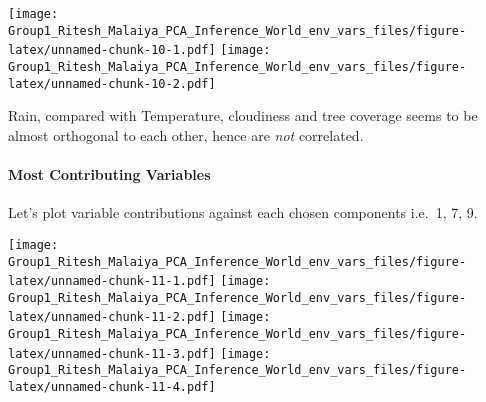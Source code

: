 \documentclass[]{article}
\newenvironment{Shaded}{\begin{snugshade}}{\end{snugshade}}
\newcommand{\DataTypeTok}[1]{\textcolor[rgb]{0.13,0.29,0.53}{#1}}
\newcommand{\DecValTok}[1]{\textcolor[rgb]{0.00,0.00,0.81}{#1}}
\newcommand{\KeywordTok}[1]{\textcolor[rgb]{0.13,0.29,0.53}{\textbf{#1}}}
\newcommand{\NormalTok}[1]{#1}
\newcommand{\OperatorTok}[1]{\textcolor[rgb]{0.81,0.36,0.00}{\textbf{#1}}}
\newcommand{\StringTok}[1]{\textcolor[rgb]{0.31,0.60,0.02}{#1}}
\let\oldparagraph\paragraph
\renewcommand{\paragraph}[1]{\oldparagraph{#1}\mbox{}}
\begin{document}
\begin{Shaded}
\end{Shaded}

\texttt{[image: Group1\_Ritesh\_Malaiya\_PCA\_Inference\_World\_env\_vars\_files/figure-latex/unnamed-chunk-10-1.pdf]}
\texttt{[image: Group1\_Ritesh\_Malaiya\_PCA\_Inference\_World\_env\_vars\_files/figure-latex/unnamed-chunk-10-2.pdf]}

Rain, compared with Temperature, cloudiness and tree coverage seems to
be almost orthogonal to each other, hence are \emph{not} correlated.

\hypertarget{most-contributing-variables}{%
\paragraph{Most Contributing
Variables}\label{most-contributing-variables}}

Let's plot variable contributions against each chosen components i.e.~1,
7, 9.

\texttt{[image: Group1\_Ritesh\_Malaiya\_PCA\_Inference\_World\_env\_vars\_files/figure-latex/unnamed-chunk-11-1.pdf]}
\texttt{[image: Group1\_Ritesh\_Malaiya\_PCA\_Inference\_World\_env\_vars\_files/figure-latex/unnamed-chunk-11-2.pdf]}
\texttt{[image: Group1\_Ritesh\_Malaiya\_PCA\_Inference\_World\_env\_vars\_files/figure-latex/unnamed-chunk-11-3.pdf]}
\texttt{[image: Group1\_Ritesh\_Malaiya\_PCA\_Inference\_World\_env\_vars\_files/figure-latex/unnamed-chunk-11-4.pdf]}
\end{document}
